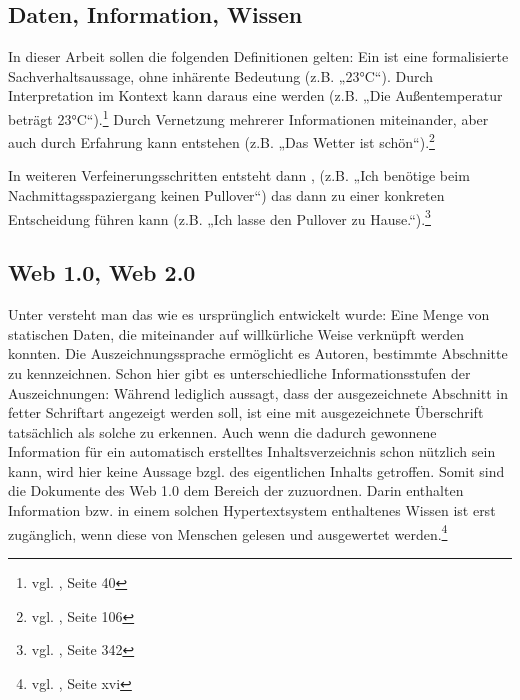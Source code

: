 
\subsection{Daten, Information, Wissen}
\label{sub:defwissen}

In dieser Arbeit sollen die folgenden Definitionen gelten: Ein  ist eine formalisierte Sachverhaltsaussage, ohne inhärente Bedeutung (z.B. „23°C“). Durch Interpretation im Kontext kann daraus eine  werden (z.B. „Die Außentemperatur beträgt 23°C“).\footnote{vgl. \cite{kfk}, Seite 40} Durch Vernetzung mehrerer Informationen miteinander, aber auch durch Erfahrung kann  entstehen (z.B. „Das Wetter ist schön“).\footnote{vgl. \cite{pnik}, Seite 106}

In weiteren Verfeinerungsschritten entsteht dann , (z.B. „Ich benötige beim Nachmittagsspaziergang keinen Pullover“) das dann zu einer konkreten Entscheidung führen kann (z.B. „Ich lasse den Pullover zu Hause.“).\footnote{vgl. \cite{taylor}, Seite 342}

\subsection{Web 1.0, Web 2.0}

Unter  versteht man das  wie es ursprünglich entwickelt wurde: Eine Menge von statischen Daten, die miteinander auf willkürliche Weise verknüpft werden konnten. Die Auszeichnungssprache  ermöglicht es Autoren, bestimmte Abschnitte zu kennzeichnen. Schon hier gibt es unterschiedliche Informationsstufen der Auszeichnungen: Während  lediglich aussagt, dass der ausgezeichnete Abschnitt in fetter Schriftart angezeigt werden soll, ist eine mit  ausgezeichnete Überschrift tatsächlich als solche zu erkennen. Auch wenn die dadurch gewonnene Information für ein automatisch erstelltes Inhaltsverzeichnis schon nützlich sein kann, wird hier keine Aussage bzgl. des eigentlichen Inhalts getroffen. Somit sind die Dokumente des Web 1.0 dem Bereich der  zuzuordnen. Darin enthalten Information bzw. in einem solchen Hypertextsystem enthaltenes Wissen ist erst zugänglich, wenn diese von Menschen gelesen und ausgewertet werden.\footnote{vgl. \cite{alkhatib}, Seite xvi} 

